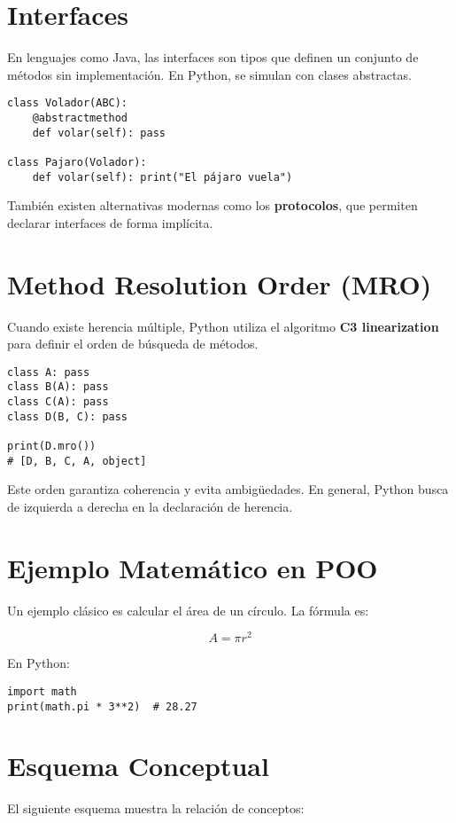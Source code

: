 \documentclass[a4paper,12pt]{article}
\begin{document}
\section{Interfaces}
En lenguajes como Java, las interfaces son tipos que definen un conjunto de métodos sin implementación.  
En Python, se simulan con clases abstractas.

\begin{lstlisting}
class Volador(ABC):
    @abstractmethod
    def volar(self): pass

class Pajaro(Volador):
    def volar(self): print("El pájaro vuela")
\end{lstlisting}

También existen alternativas modernas como los \textbf{protocolos}, que permiten declarar interfaces de forma implícita.

\section{Method Resolution Order (MRO)}
Cuando existe herencia múltiple, Python utiliza el algoritmo \textbf{C3 linearization} para definir el orden de búsqueda de métodos.

\begin{lstlisting}
class A: pass
class B(A): pass
class C(A): pass
class D(B, C): pass

print(D.mro())
# [D, B, C, A, object]
\end{lstlisting}

Este orden garantiza coherencia y evita ambigüedades.  
En general, Python busca de izquierda a derecha en la declaración de herencia.

\section{Ejemplo Matemático en POO}
Un ejemplo clásico es calcular el área de un círculo. La fórmula es:

\[
A = \pi r^2
\]

En Python:
\begin{lstlisting}
import math
print(math.pi * 3**2)  # 28.27
\end{lstlisting}

\section{Esquema Conceptual}
El siguiente esquema muestra la relación de conceptos:
\end{document}
